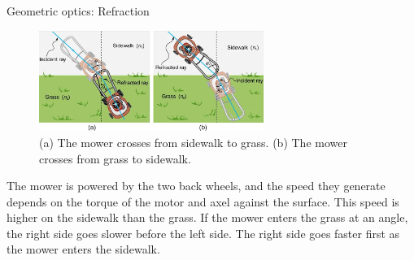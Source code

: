 \documentclass{beamer}
\begin{document}
\begin{frame}[fragile]{Geometric optics: Refraction}
\begin{figure}
\centering
\includegraphics[width=0.65\textwidth]{figures/mower.png}
\caption{\label{fig:mower} (a) The mower crosses from sidewalk to grass. (b) The mower crosses from grass to sidewalk.}
\end{figure}
\footnotesize
The mower is powered by the two back wheels, and the speed they generate depends on the torque of the motor and axel against the surface.  This speed is higher on the sidewalk than the grass.  If the mower enters the grass at an angle, the right side goes slower before the left side.  The right side goes faster first as the mower enters the sidewalk.
\end{frame}
\end{document}
